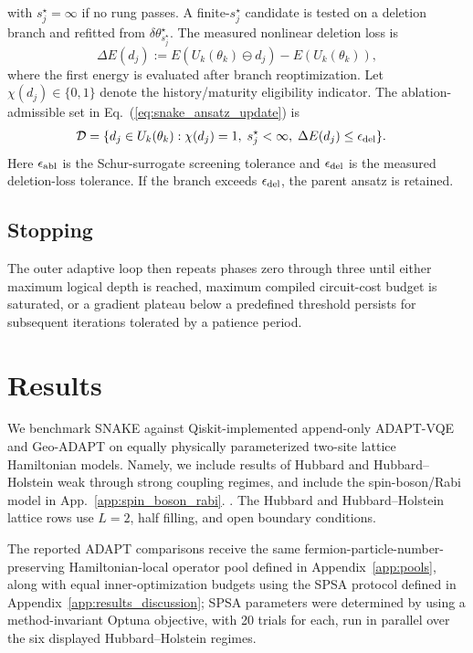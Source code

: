 \documentclass[
  reprint,
  amsmath,
  amssymb,
  aps,
  pra,
  nofootinbib,
  superscriptaddress,
  floatfix
]{revtex4-2}
\begin{document}
with \(s_j^\star=\infty\) if no rung passes. A finite-\(s_j^\star\) candidate is tested on a deletion branch and refitted from \(\delta\theta_{s_j^\star}^\star\). The measured nonlinear deletion loss is
\begin{equation}
\Delta E(d_j)
:=
E(U_k(\theta_k)\ominus d_j)-E(U_k(\theta_k)),
\label{eq:ablation_refit_loss}
\end{equation}
where the first energy is evaluated after branch reoptimization. Let \(\chi(d_j)\in\{0,1\}\) denote the history/maturity eligibility indicator. The ablation-admissible set in Eq.~(\ref{eq:snake_ansatz_update}) is
\begin{equation}
\begin{aligned}
\mathcal D
=
\{d_j\in U_k(\theta_k):\;&
\chi(d_j)=1,\;
s_j^\star<\infty,\;
\Delta E(d_j)\le\epsilon_{\rm del}\}.
\end{aligned}
\label{eq:ablation_admissible_set}
\end{equation}
Here \(\epsilon_{\rm abl}\) is the Schur-surrogate screening tolerance and \(\epsilon_{\rm del}\) is the measured deletion-loss tolerance. If the branch exceeds \(\epsilon_{\rm del}\), the parent ansatz is retained.

\subsection{Stopping}
The outer adaptive loop then repeats phases zero through three until either maximum logical depth is reached, maximum compiled circuit-cost budget is saturated, or a gradient plateau below a predefined threshold persists for subsequent iterations tolerated by a patience period.


\section{Results}
\label{sec:results}
\label{sec:benchmarks}

We benchmark SNAKE against Qiskit-implemented append-only ADAPT-VQE and Geo-ADAPT on equally physically parameterized two-site lattice Hamiltonian models. Namely, we include results of Hubbard and Hubbard--Holstein weak through strong coupling regimes, and include the spin-boson/Rabi model in App.~\ref{app:spin_boson_rabi}. \cite{JavadiAbhari2024Qiskit,QiskitAlgorithmsAdaptVQE}. The Hubbard and Hubbard--Holstein lattice rows use \(L=2\), half filling, and open boundary conditions.

The reported ADAPT comparisons receive the same fermion-particle-number-preserving Hamiltonian-local operator pool defined in Appendix~\ref{app:pools}, along with equal inner-optimization budgets using the SPSA protocol defined in Appendix~\ref{app:results_discussion}; SPSA parameters were determined by using a method-invariant Optuna objective, with 20 trials for each, run in parallel over the six displayed Hubbard--Holstein regimes.
\end{document}
